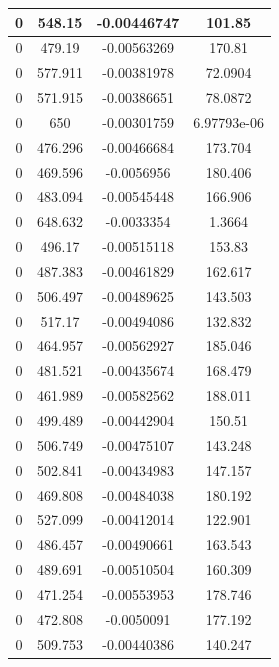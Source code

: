 \begin{table}[h]
{\begin{tabular}{|c|c|c|c|}
0   &   548.15   &   -0.00446747   &   101.85  \\  \hline  
0   &   479.19   &   -0.00563269   &   170.81  \\  \hline  
0   &   577.911   &   -0.00381978   &   72.0904  \\  \hline  
0   &   571.915   &   -0.00386651   &   78.0872  \\  \hline  
0   &   650   &   -0.00301759   &   6.97793e-06  \\  \hline  
0   &   476.296   &   -0.00466684   &   173.704  \\  \hline  
0   &   469.596   &   -0.0056956   &   180.406  \\  \hline  
0   &   483.094   &   -0.00545448   &   166.906  \\  \hline  
0   &   648.632   &   -0.0033354   &   1.3664  \\  \hline  
0   &   496.17   &   -0.00515118   &   153.83  \\  \hline  
0   &   487.383   &   -0.00461829   &   162.617  \\  \hline  
0   &   506.497   &   -0.00489625   &   143.503  \\  \hline  
0   &   517.17   &   -0.00494086   &   132.832  \\  \hline  
0   &   464.957   &   -0.00562927   &   185.046  \\  \hline  
0   &   481.521   &   -0.00435674   &   168.479  \\  \hline  
0   &   461.989   &   -0.00582562   &   188.011  \\  \hline  
0   &   499.489   &   -0.00442904   &   150.51  \\  \hline  
0   &   506.749   &   -0.00475107   &   143.248  \\  \hline  
0   &   502.841   &   -0.00434983   &   147.157  \\  \hline  
0   &   469.808   &   -0.00484038   &   180.192  \\  \hline  
0   &   527.099   &   -0.00412014   &   122.901  \\  \hline  
0   &   486.457   &   -0.00490661   &   163.543  \\  \hline  
0   &   489.691   &   -0.00510504   &   160.309  \\  \hline  
0   &   471.254   &   -0.00553953   &   178.746  \\  \hline  
0   &   472.808   &   -0.0050091   &   177.192  \\  \hline  
0   &   509.753   &   -0.00440386   &   140.247  \\  \hline  

\end{tabular}}
\end{table}
